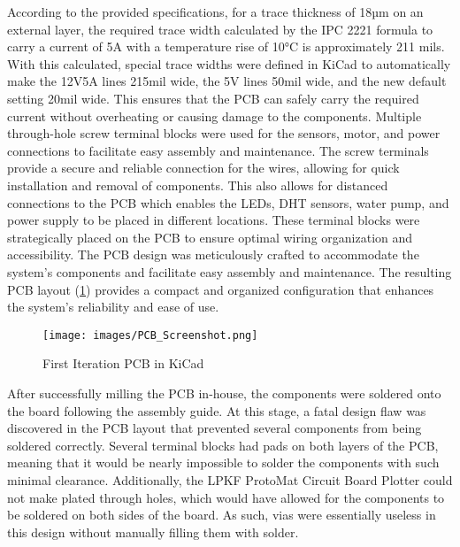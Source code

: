 \documentclass[12pt]{article} %
\begin{document}
\noindent According to the provided specifications, for a trace thickness of 18µm on an external layer, the required trace width calculated by the IPC 2221 formula to carry a current of 5A with a temperature rise of 10°C is approximately 211 mils. With this calculated, special trace widths were defined in KiCad to automatically make the 12V5A lines 215mil wide, the 5V lines 50mil wide, and the new default setting 20mil wide. This ensures that the PCB can safely carry the required current without overheating or causing damage to the components.
\newline
\newline
\noindent Multiple through-hole screw terminal blocks were used for the sensors, motor, and power connections to facilitate easy assembly and maintenance. The screw terminals provide a secure and reliable connection for the wires, allowing for quick installation and removal of components. This also allows for distanced connections to the PCB which enables the LEDs, DHT sensors, water pump, and power supply to be placed in different locations. These terminal blocks were strategically placed on the PCB to ensure optimal wiring organization and accessibility. The PCB design was meticulously crafted to accommodate the system's components and facilitate easy assembly and maintenance. The resulting PCB layout (\ref{fig:PCB_DESIGN}) provides a compact and organized configuration that enhances the system's reliability and ease of use.
\begin{figure}[H]
    \centering
    \texttt{[image: images/PCB\_Screenshot.png]}
    \caption{First Iteration PCB in KiCad}
    \label{fig:PCB_DESIGN}
\end{figure}
\noindent After successfully milling the PCB in-house, the components were soldered onto the board following the assembly guide. At this stage, a fatal design flaw was discovered in the PCB layout that prevented several components from being soldered correctly. Several terminal blocks had pads on both layers of the PCB, meaning that it would be nearly impossible to solder the components with such minimal clearance. Additionally, the LPKF ProtoMat Circuit Board Plotter could not make plated through holes, which would have allowed for the components to be soldered on both sides of the board. As such, vias were essentially useless in this design without manually filling them with solder.
\end{document}
